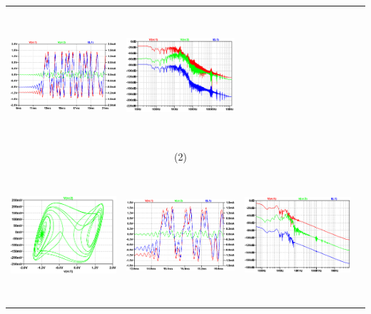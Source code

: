 \documentclass{rbf}
\begin{document}
\begin{table}[h]
\begin{tabular}{c c c c}
        \includegraphics[width=5cm,height=5cm]{r0/ro10TS.png}&
        \includegraphics[width=5cm,height=5cm]{r0/ro10FFT.png}&\\
        & (2) & \\
        \includegraphics[width=5cm,height=5cm]{r0/ro20.png}&
        \includegraphics[width=5cm,height=5cm]{r0/ro20TS.png}&
        \includegraphics[width=5cm,height=5cm]{r0/ro20FFT.png}&\\

\end{tabular}
\end{table}
\end{document}
